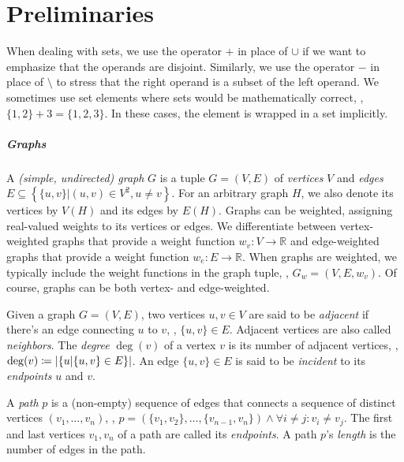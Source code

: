 \chapter{Preliminaries}
\label{chap:preliminaries}



When dealing with sets, we use the operator $+$ in place of $\cup$ if we want to emphasize that the operands are disjoint.
Similarly, we use the operator $-$ in place of $\setminus$ to stress that the right operand is a subset of the left operand.
We sometimes use set elements where sets would be mathematically correct, \eg{}, $\{1,2\} + 3 = \{1,2,3\}$.
In these cases, the element is wrapped in a set implicitly.


\paragraph{Graphs}

A \emph{(simple, undirected) graph} $G$ is a tuple $G = (V, E)$ of \emph{vertices} $V$ and \emph{edges} $E \subseteq \left\{\{u,v\} \vert (u,v) \in V^2, u \neq v \right\}$.
For an arbitrary graph $H$, we also denote its vertices by $V(H)$ and its edges by $E(H)$.
Graphs can be weighted, assigning real-valued weights to its vertices or edges.
We differentiate between vertex-weighted graphs that provide a weight function $w_v \colon V \to \mathbb{R}$ and edge-weighted graphs that provide a weight function $w_e \colon E \to \mathbb{R}$.
When graphs are weighted, we typically include the weight functions in the graph tuple, \eg{}, $G_w = (V,E,w_v)$.
Of course, graphs can be both vertex- and edge-weighted.

Given a graph $G = (V, E)$, two vertices $u, v \in V$ are said to be \emph{adjacent} if there's an edge connecting $u$ to $v$, \ie{}, $\{u, v\} \in E$.
Adjacent vertices are also called \emph{neighbors}.
The \emph{degree} $\deg(v)$ of a vertex $v$ is its number of adjacent vertices, \ie{}, $\deg(v) \coloneqq \left\lvert\{u \vert \{u,v\} \in E\}\right\rvert$.
An edge $\{u, v\} \in E$ is said to be \emph{incident} to its \emph{endpoints} $u$ and $v$.

A \emph{path} $p$ is a (non-empty) sequence of edges that connects a sequence of distinct vertices $(v_1, \dots, v_n)$, \ie{}, $p = (\{v_1, v_2\}, \dots, \{v_{n-1},v_n\}) \land \forall i \neq j \colon v_i \neq v_j$.
The first and last vertices $v_1, v_n$ of a path are called its \emph{endpoints}.
A path $p$'s \emph{length} is the number of edges in the path.

